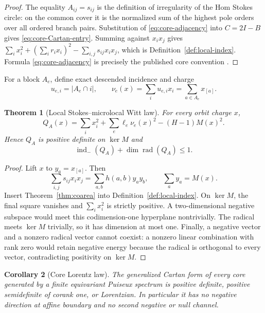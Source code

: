 \documentclass[11pt,a4paper]{amsart}
\theoremstyle{plain}
\newtheorem{theorem}{Theorem}[section]
\newtheorem{corollary}[theorem]{Corollary}
\theoremstyle{definition}
\newcommand{\indm}{\operatorname{ind}_{-}}
\newcommand{\Rad}{\operatorname{rad}}
\begin{document}
\begin{proof}
The equality $A_{ij}=s_{ij}$ is the definition of irregularity of the Hom Stokes circle: on the
common cover it is the normalized sum of the highest pole orders over all ordered branch pairs.
Substitution of \eqref{eq:core-adjacency} into $C=2I-B$ gives
\eqref{eq:core-Cartan-entry}.  Summing against $x_ix_j$ gives
$\sum_i x_i^2+(\sum_i r_ix_i)^2-\sum_{i,j}s_{ij}x_ix_j$, which is
Definition~\ref{def:local-index}.  Formula \eqref{eq:core-adjacency} is precisely the published
core convention \cite{BoalchYamakawa2020,Doucot2021}.
\end{proof}

For a block $A_e$, define exact descended incidence and charge
\begin{equation}\label{eq:descended-cut}
        u_{e,i}=|A_e\cap i|,\qquad
        \nu_e(x)=\sum_i u_{e,i}x_i=\sum_{a\in A_e}x_{[a]}.
\end{equation}

\begin{theorem}[Local Stokes--microlocal Witt law]\label{thm:local-witt}
For every orbit charge $x$,
\begin{equation}\label{eq:local-witt}
 \boxed{Q_A(x)=\sum_i x_i^2+\sum_e\ell_e\nu_e(x)^2-(H-1)M(x)^2.}
\end{equation}
Hence $Q_A$ is positive definite on $\ker M$ and
\begin{equation}\label{eq:local-joint-inertia}
                 \indm(Q_A)+\dim\Rad(Q_A)\leq1.
\end{equation}
\end{theorem}

\begin{proof}
Lift $x$ to $y_a=x_{[a]}$.  Then
\[
 \sum_{i,j}s_{ij}x_ix_j=\sum_{a,b}h(a,b)y_ay_b,
 \qquad \sum_ay_a=M(x).
\]
Insert Theorem~\ref{thm:coarea} into Definition~\ref{def:local-index}.  On $\ker M$, the final
square vanishes and $\sum_i x_i^2$ is strictly positive.  A two-dimensional negative subspace
would meet this codimension-one hyperplane nontrivially.  The radical meets $\ker M$ trivially,
so it has dimension at most one.  Finally, a negative vector and a nonzero radical vector cannot
coexist: a nonzero linear combination with rank zero would retain negative energy because the
radical is orthogonal to every vector, contradicting positivity on $\ker M$.
\end{proof}

\begin{corollary}[Core Lorentz law]\label{cor:core-lorentz}
The generalized Cartan form of every core generated by a finite equivariant Puiseux spectrum is
positive definite, positive semidefinite of corank one, or Lorentzian.  In particular it has no
negative direction at affine boundary and no second negative or null channel.
\end{corollary}
\end{document}
